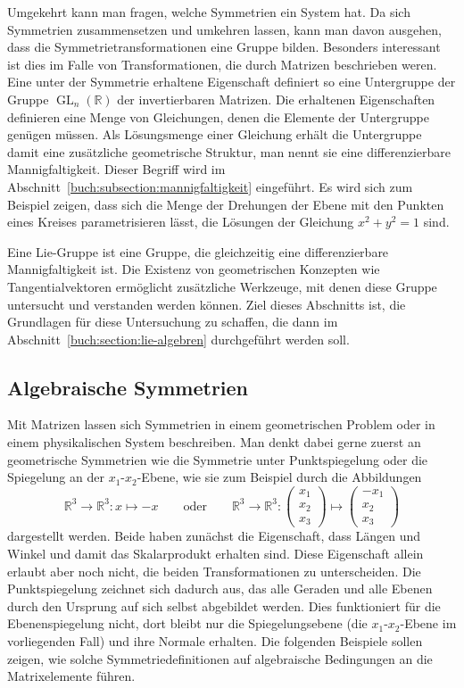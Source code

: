 Umgekehrt kann man fragen, welche Symmetrien ein System hat.
Da sich Symmetrien zusammensetzen und umkehren lassen, kann man davon
ausgehen, dass die Symmetrietransformationen eine Gruppe bilden.
Besonders interessant ist dies im Falle von Transformationen, die
durch Matrizen beschrieben weren.
Eine unter der Symmetrie erhaltene Eigenschaft definiert so eine
Untergruppe der Gruppe $\operatorname{GL}_n(\mathbb{R})$ der
invertierbaren Matrizen.
Die erhaltenen Eigenschaften definieren eine Menge von Gleichungen,
denen die Elemente der Untergruppe genügen müssen.
Als Lösungsmenge einer Gleichung erhält die Untergruppe damit eine
zusätzliche geometrische Struktur, man nennt sie eine differenzierbare
Mannigfaltigkeit.
Dieser Begriff wird im Abschnitt~\ref{buch:subsection:mannigfaltigkeit}
eingeführt.
Es wird sich zum Beispiel zeigen, dass sich die Menge der Drehungen der
Ebene mit den Punkten eines Kreises parametrisieren lässt,
die Lösungen der Gleichung $x^2+y^2=1$ sind.

Eine Lie-Gruppe ist eine Gruppe, die gleichzeitig eine differenzierbare
Mannigfaltigkeit ist.
Die Existenz von geometrischen Konzepten wie Tangentialvektoren
ermöglicht zusätzliche Werkzeuge, mit denen diese Gruppe untersucht
und verstanden werden können.
Ziel dieses Abschnitts ist, die Grundlagen für diese Untersuchung zu
schaffen, die dann im Abschnitt~\ref{buch:section:lie-algebren}
durchgeführt werden soll.

\subsection{Algebraische Symmetrien
\label{buch:subsection:algebraische-symmetrien}}
Mit Matrizen lassen sich Symmetrien in einem geometrischen Problem
oder in einem physikalischen System beschreiben.
Man denkt dabei gerne zuerst an geometrische Symmetrien wie die
Symmetrie unter Punktspiegelung oder die Spiegelung an der $x_1$-$x_2$-Ebene,
wie sie zum Beispiel durch die Abbildungen
\[
\mathbb{R}^3\to\mathbb{R}^3 : x\mapsto -x
\qquad\text{oder}\qquad
\mathbb{R}^3\to\mathbb{R}^3 :
\begin{pmatrix}x_1\\x_2\\x_3\end{pmatrix}
\mapsto
\begin{pmatrix}-x_1\\x_2\\x_3\end{pmatrix}
\]
dargestellt werden.
Beide haben zunächst die Eigenschaft, dass Längen und Winkel und damit
das Skalarprodukt erhalten sind.
Diese Eigenschaft allein erlaubt aber noch nicht, die beiden Transformationen
zu unterscheiden.
Die Punktspiegelung zeichnet sich dadurch aus, das alle Geraden und alle
Ebenen durch den Ursprung auf sich selbst abgebildet werden.
Dies funktioniert für die Ebenenspiegelung nicht, dort bleibt nur die
Spiegelungsebene (die $x_1$-$x_2$-Ebene im vorliegenden Fall) und
ihre Normale erhalten.
Die folgenden Beispiele sollen zeigen, wie solche Symmetriedefinitionen
auf algebraische Bedingungen an die Matrixelemente führen.

